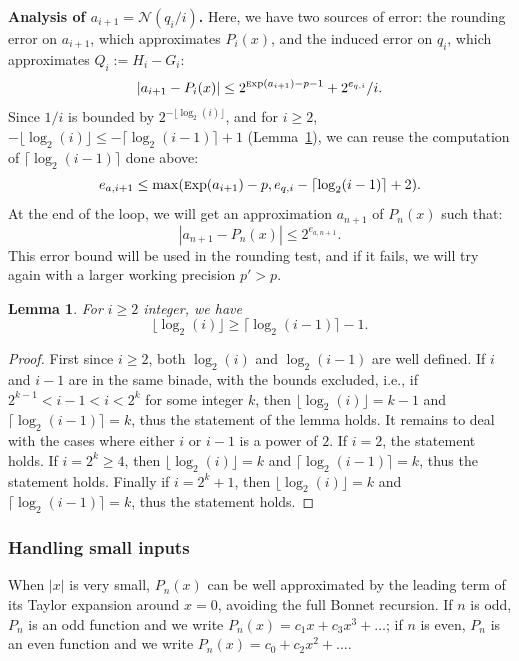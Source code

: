 \documentclass[12pt]{amsart}
\def\Exp{{\rm \textsc exp}}
\def\N{{\mathcal N}}
\newtheorem{lemma}{Lemma}
\begin{document}
\par\noindent
\textbf{Analysis of $a_{i+1} = \N{}(q_i/i)$.}
Here, we have two sources of error: the rounding error on $a_{i+1}$,
which approximates $P_i(x)$, and the induced error on $q_i$, which
approximates $Q_i := H_i - G_i$:
\[ |a_{i+1} - P_i(x)| \le 2^{\Exp(a_{i+1})-p-1} + 2^{e_{q,i}}/i. \]
Since $1/i$ is bounded by $2^{-\lfloor \log_2(i) \rfloor}$, and for
$i \ge 2$, $-\lfloor \log_2(i) \rfloor \le -\lceil \log_2(i-1) \rceil +1$
(Lemma~\ref{lemma8}),
we can reuse the computation of $\lceil \log_2(i-1) \rceil$ done above:
\[ e_{a,i+1} \le \max(\Exp(a_{i+1})-p, e_{q,i} - \lceil \log_2(i-1) \rceil + 2). \]
At the end of the loop, we will get an approximation $a_{n+1}$ of $P_n(x)$ such
that:
\[ |a_{n+1} - P_n(x)| \le 2^{e_{a,n+1}}. \]
This error bound will be used in the rounding test, and if it fails, we will try
again with a larger working precision $p' > p$.

\begin{lemma} \label{lemma8}
  For $i \ge 2$ integer, we have
  \[ \lfloor \log_2(i) \rfloor \ge \lceil \log_2(i-1) \rceil - 1. \]
\end{lemma}
\begin{proof}
  First since $i \ge 2$, both $\log_2(i)$ and $\log_2(i-1)$ are well defined.
  If $i$ and $i-1$ are in the same binade, with the bounds excluded, i.e.,
  if $2^{k-1} < i-1 < i < 2^k$ for some integer $k$, then
  $\lfloor \log_2(i) \rfloor = k-1$ and $\lceil \log_2(i-1) \rceil = k$,
  thus the statement of the lemma holds.
  It remains to deal with the cases where either $i$ or $i-1$ is a power of $2$.
  If $i=2$, the statement holds.
  If $i=2^k \ge 4$, then $\lfloor \log_2(i) \rfloor = k$ and
  $\lceil \log_2(i-1) \rceil = k$, thus the statement holds.
  Finally if $i=2^k+1$, then $\lfloor \log_2(i) \rfloor = k$ and
  $\lceil \log_2(i-1) \rceil = k$, thus the statement holds.
\end{proof}

\subsubsection{Handling small inputs}
\label{subsec:legendre-small-inputs}

When $|x|$ is very small, $P_n(x)$ can be well approximated by the leading
term of its Taylor expansion around $x=0$, avoiding the full Bonnet recursion.
If $n$ is odd, $P_n$ is an odd function and we write
$P_n(x) = c_1 x + c_3 x^3 + \dots$;
if $n$ is even, $P_n$ is an even function and we write
$P_n(x) = c_0 + c_2 x^2 + \dots$.
\end{document}

